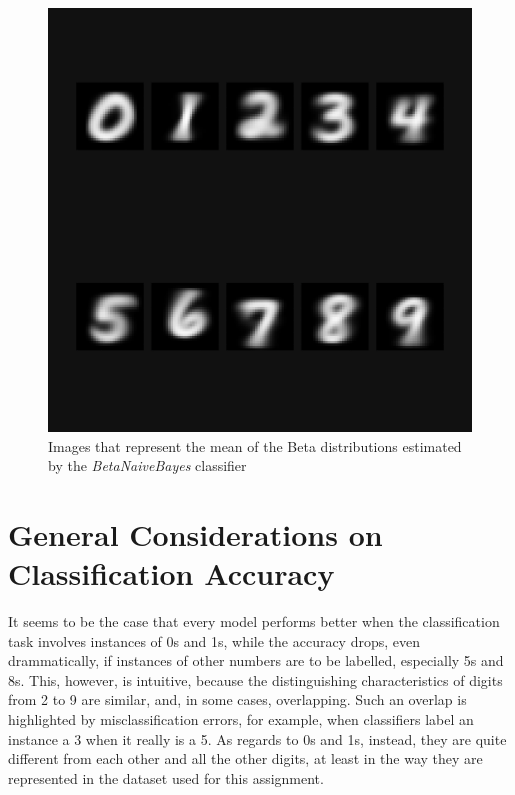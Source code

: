 \begin{figure}[h]
    \centering
    \includegraphics[scale=0.25]{images/exp-results/bayes/beta_means.png}
    \caption{Images that represent the mean of the Beta distributions estimated by the \textit{BetaNaiveBayes} classifier}
    \label{fig:exp_res_bayes_beta_means}
\end{figure}


\newpage
\section{General Considerations on Classification Accuracy}

It seems to be the case that every model performs better when the classification task involves instances of 0s and 1s, while the accuracy drops, even drammatically, if instances of other numbers are to be labelled, especially 5s and 8s. 
This, however, is intuitive, because the distinguishing characteristics of digits from 2 to 9 are similar, and, in some cases, overlapping. Such an overlap is highlighted by misclassification errors, for example, when classifiers label an instance a 3 when it really is a 5. As regards to 0s and 1s, instead, they are quite different from each other and all the other digits, at least in the way they are represented in the dataset used for this assignment.


